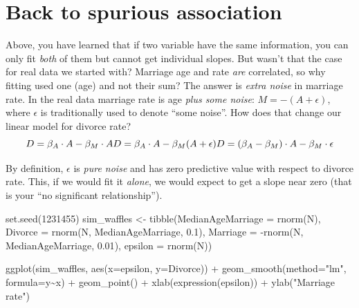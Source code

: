 \documentclass[
]{book}
\newenvironment{Shaded}{\begin{snugshade}}{\end{snugshade}}
\newcommand{\AttributeTok}[1]{\textcolor[rgb]{0.77,0.63,0.00}{#1}}
\newcommand{\DecValTok}[1]{\textcolor[rgb]{0.00,0.00,0.81}{#1}}
\newcommand{\FloatTok}[1]{\textcolor[rgb]{0.00,0.00,0.81}{#1}}
\newcommand{\FunctionTok}[1]{\textcolor[rgb]{0.00,0.00,0.00}{#1}}
\newcommand{\NormalTok}[1]{#1}
\newcommand{\OtherTok}[1]{\textcolor[rgb]{0.56,0.35,0.01}{#1}}
\newcommand{\SpecialCharTok}[1]{\textcolor[rgb]{0.00,0.00,0.00}{#1}}
\newcommand{\StringTok}[1]{\textcolor[rgb]{0.31,0.60,0.02}{#1}}
\begin{document}
\hypertarget{back-to-spurious-association}{%
\section{Back to spurious association}\label{back-to-spurious-association}}

Above, you have learned that if two variable have the same information, you can only fit \emph{both} of them but cannot get individual slopes. But wasn't that the case for real data we started with? Marriage age and rate \emph{are} correlated, so why fitting used one (age) and not their sum? The answer is \emph{extra noise} in marriage rate. In the real data marriage rate is age \emph{plus some noise}: \(M = -(A + \epsilon)\), where \(\epsilon\) is traditionally used to denote ``some noise''. How does that change our linear model for divorce rate?
\[
D = \beta_A \cdot A - \beta_M \cdot A \\
D = \beta_A \cdot A - \beta_M (A + \epsilon) \\
D = (\beta_A  - \beta_M ) \cdot A - \beta_M \cdot \epsilon
\]

By definition, \(\epsilon\) is \emph{pure noise} and has zero predictive value with respect to divorce rate. This, if we would fit it \emph{alone}, we would expect to get a slope near zero (that is your ``no significant relationship'').

\begin{Shaded}
\begin{Highlighting}[]
\FunctionTok{set.seed}\NormalTok{(}\DecValTok{1231455}\NormalTok{)}
\NormalTok{sim\_waffles }\OtherTok{\textless{}{-}} \FunctionTok{tibble}\NormalTok{(}\AttributeTok{MedianAgeMarriage =} \FunctionTok{rnorm}\NormalTok{(N),}
                      \AttributeTok{Divorce =} \FunctionTok{rnorm}\NormalTok{(N, MedianAgeMarriage, }\FloatTok{0.1}\NormalTok{),}
                      \AttributeTok{Marriage =} \SpecialCharTok{{-}}\FunctionTok{rnorm}\NormalTok{(N, MedianAgeMarriage, }\FloatTok{0.01}\NormalTok{),}
                      \AttributeTok{epsilon =} \FunctionTok{rnorm}\NormalTok{(N))}

\FunctionTok{ggplot}\NormalTok{(sim\_waffles, }\FunctionTok{aes}\NormalTok{(}\AttributeTok{x=}\NormalTok{epsilon, }\AttributeTok{y=}\NormalTok{Divorce)) }\SpecialCharTok{+} 
  \FunctionTok{geom\_smooth}\NormalTok{(}\AttributeTok{method=}\StringTok{"lm"}\NormalTok{, }\AttributeTok{formula=}\NormalTok{y}\SpecialCharTok{\textasciitilde{}}\NormalTok{x) }\SpecialCharTok{+} 
    \FunctionTok{geom\_point}\NormalTok{() }\SpecialCharTok{+} 
    \FunctionTok{xlab}\NormalTok{(}\FunctionTok{expression}\NormalTok{(epsilon)) }\SpecialCharTok{+} 
    \FunctionTok{ylab}\NormalTok{(}\StringTok{"Marriage rate"}\NormalTok{)}
\end{Highlighting}
\end{Shaded}
\end{document}
